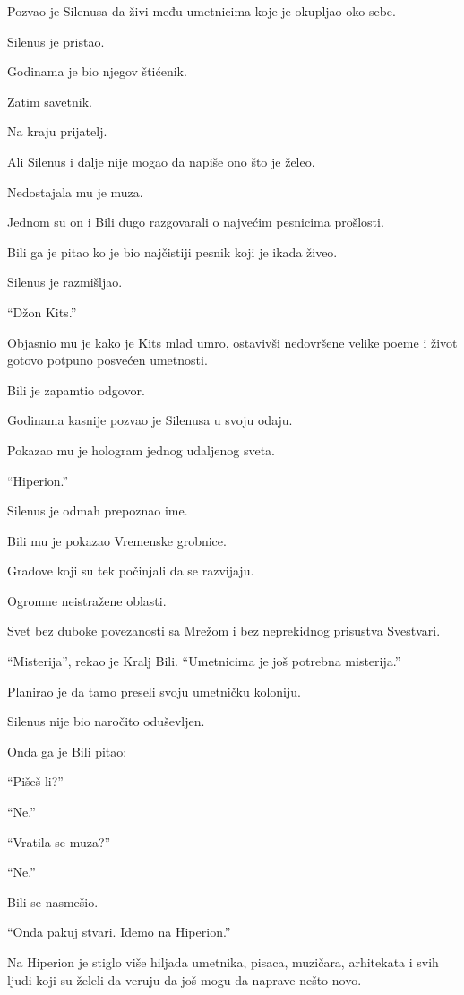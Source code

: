 Pozvao je Silenusa da živi među umetnicima koje je okupljao oko sebe.

Silenus je pristao.

Godinama je bio njegov štićenik.

Zatim savetnik.

Na kraju prijatelj.

Ali Silenus i dalje nije mogao da napiše ono što je želeo.

Nedostajala mu je muza.

Jednom su on i Bili dugo razgovarali o najvećim pesnicima prošlosti.

Bili ga je pitao ko je bio najčistiji pesnik koji je ikada živeo.

Silenus je razmišljao.

``Džon Kits.''

Objasnio mu je kako je Kits mlad umro, ostavivši nedovršene velike poeme i život gotovo potpuno posvećen umetnosti.

Bili je zapamtio odgovor.

Godinama kasnije pozvao je Silenusa u svoju odaju.

Pokazao mu je hologram jednog udaljenog sveta.

``Hiperion.''

Silenus je odmah prepoznao ime.

Bili mu je pokazao Vremenske grobnice.

Gradove koji su tek počinjali da se razvijaju.

Ogromne neistražene oblasti.

Svet bez duboke povezanosti sa Mrežom i bez neprekidnog prisustva Svestvari.

``Misterija'', rekao je Kralj Bili. ``Umetnicima je još potrebna misterija.''

Planirao je da tamo preseli svoju umetničku koloniju.

Silenus nije bio naročito oduševljen.

Onda ga je Bili pitao:

``Pišeš li?''

``Ne.''

``Vratila se muza?''

``Ne.''

Bili se nasmešio.

``Onda pakuj stvari. Idemo na Hiperion.''

\bigskip

Na Hiperion je stiglo više hiljada umetnika, pisaca, muzičara, arhitekata i svih ljudi koji su želeli da veruju da još mogu da naprave nešto novo.

